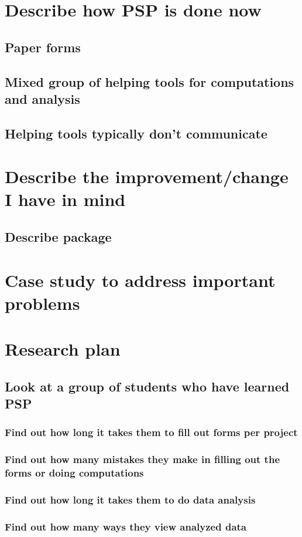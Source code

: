 \chapter{Describe how PSP is done now}
\section{Paper forms}
\section{Mixed group of helping tools for computations and analysis}
\section{Helping tools typically don't communicate}
\chapter{Describe the improvement/change I have in mind}
\section{Describe package}
\chapter{Case study to address important problems}
\chapter{Research plan}
\section{Look at a group of students who have learned PSP}
\subsection{Find out how long it takes them to fill out forms per project}
\subsection{Find out how many mistakes they make in filling out the forms or doing computations}
\subsection{Find out how long it takes them to do data analysis}
\subsection{Find out how many ways they view analyzed data}
